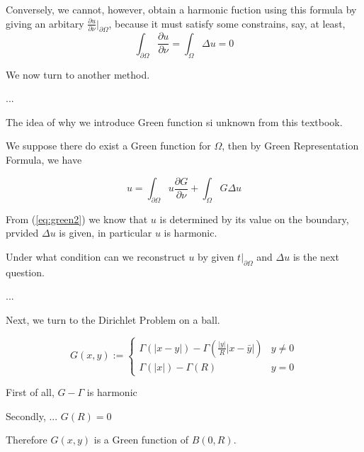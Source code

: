 \documentclass{simplenotes}
\begin{document}
\begin{remark}
Conversely, we cannot, however, obtain a harmonic fuction using this formula by giving an arbitary $\frac{\partial u}{\partial \nu}|_{\partial \Omega}$, because it must satisfy some constrains, say, at least,
\[\int_{\partial \Omega}\frac{\partial u}{\partial \nu} =\int_\Omega \Delta u =0\]
\end{remark}

We now turn to another method.

\begin{definition}
...
\end{definition}

\begin{remark}
The idea of why we introduce Green function si unknown from this textbook.
\end{remark}

We suppose there do exist a Green function for $\Omega$, then by Green Representation Formula, we have

\begin{equation}
u = \int_{\partial \Omega} u \frac{\partial G}{\partial \nu} + \int_\Omega G\Delta u\label{eq:green2}
\end{equation}

\begin{remark}
From (\ref{eq:green2}) we know that $u$ is determined by its value on the boundary, prvided $\Delta u$ is given, in particular $u$ is harmonic.
\end{remark}

\begin{remark}
Under what condition can we  reconstruct $u$ by given $t|_{\partial \Omega}$ and $\Delta u$ is the next question.

...
\end{remark}

Next, we turn to the Dirichlet Problem on a ball.


\begin{equation}
G(x,y):=\begin{cases}
\Gamma(|x-y|)-\Gamma(\frac{|y|}{R}|x-\bar y|) & y\neq 0\\
\Gamma(|x|)-\Gamma(R)& y= 0
\end{cases}
\end{equation}


First of all, $G-\Gamma$ is harmonic

Secondly,  ... $G(R)=0$

Therefore $G(x,y)$ is a Green function of $B(0,R)$.
\end{document}

